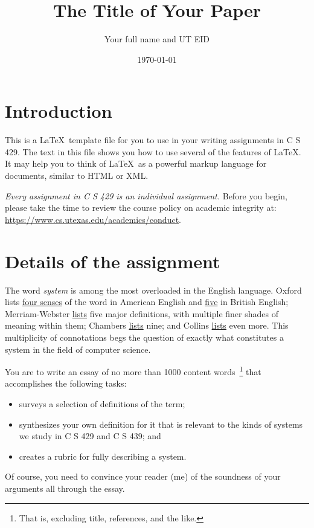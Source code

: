 \documentclass[11pt]{article}
\title{The Title of Your Paper}
\author{Your full name and UT EID}
\date{\today}
\begin{document}
\maketitle

\section{Introduction}
This is a \LaTeX\ template file for you to use in your writing assignments in C S 429.
The text in this file shows you how to use several of the features of \LaTeX.
It may help you to think of \LaTeX\ as a powerful markup language for documents, 
similar to HTML or XML.

\emph{Every assignment in C S 429 is an individual assignment.}
Before you begin, 
please take the time to review the course policy on academic integrity at:
\url{https://www.cs.utexas.edu/academics/conduct}.

\section{Details of the assignment}
The word \emph{system} is among the most overloaded in the English language.
Oxford lists \href{https://www.oxfordlearnersdictionaries.com/us/definition/american_english/system}{four senses} of the word in American English 
and \href{https://www.oxfordlearnersdictionaries.com/us/definition/english/system}{five} in British English;
Merriam-Webster \href{https://www.merriam-webster.com/dictionary/system}{lists} five major definitions,
with multiple finer shades of meaning within them;
Chambers \href{https://chambers.co.uk/search/?query=system&title=21st}{lists} nine;
and Collins \href{https://www.collinsdictionary.com/dictionary/english/system}{lists} even more.
This multiplicity of connotations begs the question of exactly what constitutes a system in the field of computer science.

You are to write an essay of no more than 1000 content words~\footnote{That is, excluding title, references, and the like.}
 that accomplishes the following tasks:
\begin{itemize}
\item surveys a selection of definitions of the term;
\item synthesizes your own definition for it that is relevant to the kinds of systems we study in C S 429 and C S 439; and
\item creates a rubric for fully describing a system.
\end{itemize}
Of course,
you need to convince your reader
(me)
of the soundness of your arguments all through the essay.
\end{document}

